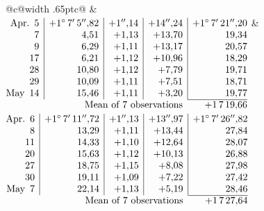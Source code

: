 \noindent\begin{tabular}{@{}c@{\hspace{.4em}\vrule width .65pt\hspace{.4em}}c@{}}
 &
 \\[.18ex]
\(\begin{array}[t]{@{}r|r|r|r|r@{}}
\text{Apr.}\enspace 5 & +1^\circ\,7'\,5''{,}82 & +1''{,}14 & +14''{,}24 & +1^\circ\,7'\,21''{,}20\\
7 & 4{,}51 & +1{,}13 & +13{,}70 & 19{,}34\\
9 & 6{,}29 & +1{,}11 & +13{,}17 & 20{,}57\\
17 & 6{,}21 & +1{,}12 & +10{,}96 & 18{,}29\\
28 & 10{,}80 & +1{,}12 & +7{,}79 & 19{,}71\\
29 & 10{,}09 & +1{,}11 & +7{,}51 & 18{,}71\\
\text{May}\enspace 14 & 15{,}46 & +1{,}11 & +3{,}20 & 19{,}77\\
\cline{5-5}
\multicolumn{4}{r}{\text{Mean of 7 observations}} & +1\,7\,19{,}66
\end{array}\)
&
\(\begin{array}[t]{@{}r|r|r|r|r@{}}
\text{Apr.}\enspace 6 & +1^\circ\,7'\,11''{,}72 & +1''{,}13 & +13''{,}97 & +1^\circ\,7'\,26''{,}82\\
8 & 13{,}29 & +1{,}11 & +13{,}44 & 27{,}84\\
11 & 14{,}33 & +1{,}10 & +12{,}64 & 28{,}07\\
20 & 15{,}63 & +1{,}12 & +10{,}13 & 26{,}88\\
27 & 18{,}75 & +1{,}15 & +8{,}08 & 27{,}98\\
30 & 19{,}11 & +1{,}09 & +7{,}22 & 27{,}42\\
\text{May}\enspace 7 & 22{,}14 & +1{,}13 & +5{,}19 & 28{,}46\\
\cline{5-5}
\multicolumn{4}{r}{\text{Mean of 7 observations}} & +1\,7\,27{,}64
\end{array}\)
\end{tabular}\par\medskip
